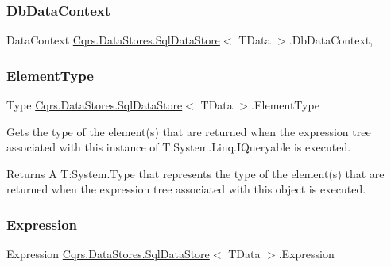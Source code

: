 \subsubsection{\texorpdfstring{Db\+Data\+Context}{DbDataContext}}
{\footnotesize\ttfamily Data\+Context \hyperlink{classCqrs_1_1DataStores_1_1SqlDataStore}{Cqrs.\+Data\+Stores.\+Sql\+Data\+Store}$<$ T\+Data $>$.Db\+Data\+Context\hspace{0.3cm}{\ttfamily [get]}, {\ttfamily [protected]}}

\mbox{\label{classCqrs_1_1DataStores_1_1SqlDataStore_ab96bad4f637c7cfc95e97598c8753d02_ab96bad4f637c7cfc95e97598c8753d02}} 
\subsubsection{\texorpdfstring{Element\+Type}{ElementType}}
{\footnotesize\ttfamily Type \hyperlink{classCqrs_1_1DataStores_1_1SqlDataStore}{Cqrs.\+Data\+Stores.\+Sql\+Data\+Store}$<$ T\+Data $>$.Element\+Type\hspace{0.3cm}{\ttfamily [get]}}



Gets the type of the element(s) that are returned when the expression tree associated with this instance of T\+:\+System.\+Linq.\+I\+Queryable is executed. 

\begin{DoxyReturn}{Returns}
A T\+:\+System.\+Type that represents the type of the element(s) that are returned when the expression tree associated with this object is executed. 
\end{DoxyReturn}
\mbox{\label{classCqrs_1_1DataStores_1_1SqlDataStore_a1fb28f14cf7762331ec9e7d5efe19c75_a1fb28f14cf7762331ec9e7d5efe19c75}} 
\subsubsection{\texorpdfstring{Expression}{Expression}}
{\footnotesize\ttfamily Expression \hyperlink{classCqrs_1_1DataStores_1_1SqlDataStore}{Cqrs.\+Data\+Stores.\+Sql\+Data\+Store}$<$ T\+Data $>$.Expression\hspace{0.3cm}{\ttfamily [get]}}



